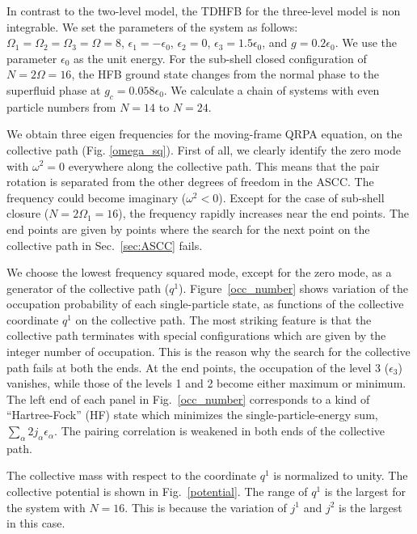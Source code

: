 \documentclass[%
superscriptaddress,
showpacs,
nofootinbib,
amsmath,amssymb,
aps,
prc,
twocolumn,
floatfix ]%
{revtex4-1}
\begin{document}
In contrast to the two-level model,
the TDHFB for the three-level model is non integrable.
We set the parameters of the system as follows:
$\Omega_1=\Omega_2=\Omega_3=\Omega=8$,
$\epsilon_1=-\epsilon_0$, $\epsilon_2=0$, $\epsilon_3=1.5\epsilon_0$,
and $g=0.2\epsilon_0$.
We use the parameter $\epsilon_0$ as the unit energy.
For the sub-shell closed configuration of $N=2\Omega=16$,
the HFB ground state changes from the normal phase to
the superfluid phase at $g_c=0.058\epsilon_0$.
We calculate a chain of systems with even particle numbers
from $N=14$ to $N=24$. 

We obtain three eigen frequencies for the moving-frame QRPA equation, 
on the collective path (Fig. \ref{omega_sq}). 
First of all, we clearly identify the zero mode with $\omega^2=0$
everywhere along the collective path.
This means that the pair rotation is separated from the other
degrees of freedom in the ASCC.
The frequency could become imaginary ($\omega^2<0$).
Except for the case of sub-shell closure ($N=2\Omega_1=16$),
the frequency rapidly increases near the end points.
The end points are given by points where the search for the next point
on the collective path in Sec.~\ref{sec:ASCC} fails.

We choose the lowest frequency squared mode, except for the zero mode,
as a generator of the collective path ($q^1$).
Figure~\ref{occ_number} shows variation of the occupation probability
of each single-particle state, as functions of the collective
coordinate $q^1$ on the collective path.
The most striking feature is that the collective path terminates
with special configurations which are given by the integer number
of occupation.
This is the reason why the search for the collective path fails
at both the ends.
At the end points,
the occupation of the level 3 ($\epsilon_3$) vanishes, while
those of the levels 1 and 2 become either maximum or minimum.
The left end of each panel in Fig.~\ref{occ_number} corresponds to 
a kind of ``Hartree-Fock'' (HF) state which minimizes
the single-particle-energy sum, $\sum_\alpha 2j_\alpha \epsilon_\alpha$.
The pairing correlation is weakened in both ends of the
collective path.

The collective mass with respect to the coordinate $q^1$ is normalized
to unity.
The collective potential is shown in Fig.~\ref{potential}.
The range of $q^1$ is the largest for the system with $N=16$.
This is because the variation of $j^1$ and $j^2$ is the largest in
this case.
\end{document}
